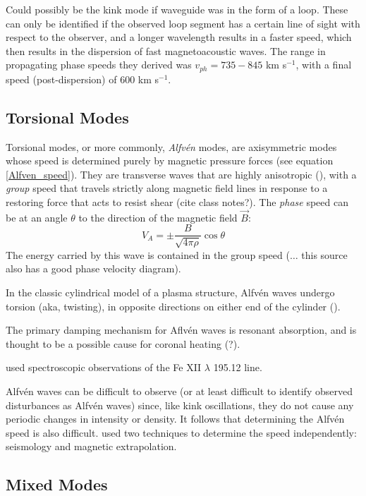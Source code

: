 \documentclass[preprint2]{aastex}
\begin{document}
Could possibly be the kink mode if waveguide was in
the form of a loop. These can only be identified if the observed loop
segment has a certain line of sight with respect to the observer,
and a longer wavelength results in a faster speed, which then results
in the dispersion of fast magnetoacoustic waves. The range in
propagating phase speeds they derived was
$ v_{ph} = 735 - 845 $ km s$^{-1}$, with a final speed
(post-dispersion) of 600 km s$^{-1}$.


\subsection{Torsional Modes}
Torsional modes, or more commonly, \emph{Alfv\'en} modes, are axisymmetric
modes whose speed is determined purely by magnetic pressure forces
(see equation \ref{Alfven_speed}).
They are transverse waves that are highly anisotropic (\cite{Goossens}),
with a \emph{group} speed that
travels strictly along magnetic field lines in response
to a restoring force that acts to resist shear (cite class notes?).
The \emph{phase} speed can be at an angle $\theta$ to the direction
of the magnetic field $\vec{B}$:
\begin{equation}
    V_A = \pm \frac{B}{\sqrt{4\pi\rho}}\cos\theta
\end{equation}
The energy carried by this wave is contained in the group speed
(\cite{Somov}$\ldots$ this source also has a good phase velocity
diagram).

In the classic cylindrical model of a plasma structure,
Alfv\'en waves undergo torsion (aka, twisting), in opposite directions on
either end of the cylinder (\cite{Nak}).

The primary damping mechanism for Aflv\'en waves is resonant absorption,
and is thought to be a possible cause for coronal heating (?).

\cite{tor_1} used spectroscopic observations of the Fe
{\footnotesize XII} $\lambda$ 195.12 line.

Alfv\'en waves can be difficult to observe (or at least difficult to
identify observed disturbances as Alfv\'en waves) since, like kink
oscillations, they do not cause any periodic changes in intensity or density.
It follows that determining the Alfv\'en speed is also difficult.
\cite{tor_2} used two techniques to determine the speed independently:
seismology and magnetic extrapolation.

\subsection{Mixed Modes}
\end{document}
